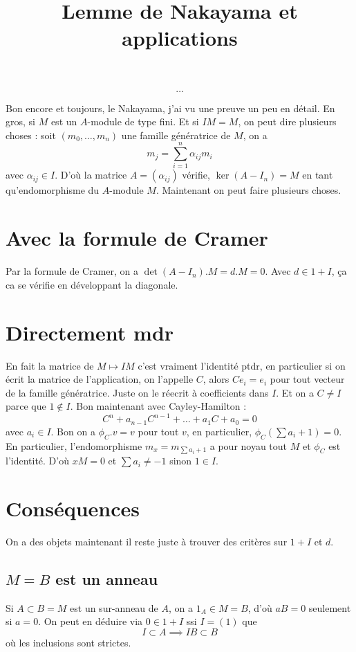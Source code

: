 \documentclass[a4paper,12pt]{book}
\title{Lemme de Nakayama et applications}
\date{}
\theoremstyle{plain}
\theoremstyle{definition}
\theoremstyle{remark}
\begin{document}
\maketitle
\tableofcontents
\[\ldots\]   

Bon encore et toujours, le Nakayama, j'ai vu une preuve un peu en détail.
En gros, si $M$ est un $A$-module de type fini. Et si $IM=M$, on peut 
dire plusieurs choses : soit $(m_0,\ldots, m_n)$ une famille génératrice
de $M$, on a 
\[m_j = \sum_{i=1}^n \alpha_{ij}m_i\]
avec $\alpha_{ij}\in I$. D'où la matrice $A=(\alpha_{ij})$ vérifie,
$\ker(A-I_n)=M$ en tant qu'endomorphisme du $A$-module $M$. Maintenant
on peut faire plusieurs choses.

\section{Avec la formule de Cramer}
Par la formule de Cramer, on a $\det(A-I_n).M=d.M=0$. Avec $d\in 1+I$, 
ça ca se vérifie en développant la diagonale. 

\section{Directement mdr}
En fait la matrice de $M\mapsto IM$ c'est vraiment l'identité ptdr,
en particulier si on écrit la matrice de l'application, on l'appelle
$C$, alors $Ce_i=e_i$ pour tout vecteur de la famille génératrice. 
Juste on le réecrit à coefficients dans $I$. Et on a $C\ne I$ parce que
$1\notin I$. Bon maintenant avec Cayley-Hamilton :
\[C^n+a_{n-1}C^{n-1}+\ldots+a_1C+a_0=0\]
avec $a_i\in I$. Bon on a $\phi_C.v=v$ pour tout $v$, en particulier,
$\phi_C(\sum a_i + 1)=0$. En particulier, l'endomorphisme 
$m_x=m_{\sum a_i +1}$ a pour noyau tout $M$ et $\phi_C$ est l'identité.
D'où $xM=0$ et $\sum a_i \ne -1$ sinon $1\in I$.

\section{Conséquences}
On a des objets maintenant il reste juste à trouver des critères sur
$1+I$ et $d$.

\subsection{$M=B$ est un anneau}
Si $A\subset B=M$ est un sur-anneau de $A$, on a $1_A\in M=B$,
d'où $aB=0$ seulement si $a=0$. On peut en déduire via 
$0\in1+I$ ssi $I=(1)$ que 
\[I\subset A\implies IB\subset B\]
où les inclusions sont strictes.
\end{document}
